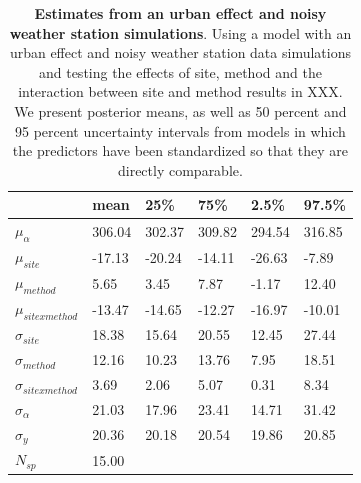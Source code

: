 \documentclass{article}\usepackage[]{graphicx}\usepackage[]{color}
\begin{document}
\begin{table}[ht]
\centering
\caption{\textbf{Estimates from an urban effect and noisy weather station simulations}. Using a model with an urban effect and noisy weather station data simulations and testing the effects of site, method and the interaction between site and method results in XXX. We present posterior means, as well as 50 percent and 95 percent uncertainty intervals from models in which the predictors have been standardized so that they are directly comparable.} 
\label{tab:urbmethod}
\begingroup\footnotesize
\begin{tabular}{|p{}|p{}p{}p{}p{}p{}|}
  \hline
 & mean & 25\% & 75\% & 2.5\% & 97.5\% \\ 
  \hline
$\mu_{\alpha}$ & 306.04 & 302.37 & 309.82 & 294.54 & 316.85 \\ 
  $\mu_{site}$ & -17.13 & -20.24 & -14.11 & -26.63 & -7.89 \\ 
  $\mu_{method}$ & 5.65 & 3.45 & 7.87 & -1.17 & 12.40 \\ 
  $\mu_{sitexmethod}$ & -13.47 & -14.65 & -12.27 & -16.97 & -10.01 \\ 
  $\sigma_{site}$ & 18.38 & 15.64 & 20.55 & 12.45 & 27.44 \\ 
  $\sigma_{method}$ & 12.16 & 10.23 & 13.76 & 7.95 & 18.51 \\ 
  $\sigma_{sitexmethod}$ & 3.69 & 2.06 & 5.07 & 0.31 & 8.34 \\ 
  $\sigma_{\alpha}$ & 21.03 & 17.96 & 23.41 & 14.71 & 31.42 \\ 
  $\sigma_{y}$ & 20.36 & 20.18 & 20.54 & 19.86 & 20.85 \\ 
   \hline
$N_{sp}$ & 15.00 &  &  &  &  \\ 
   \hline
\end{tabular}
\endgroup
\end{table}
\end{document}
